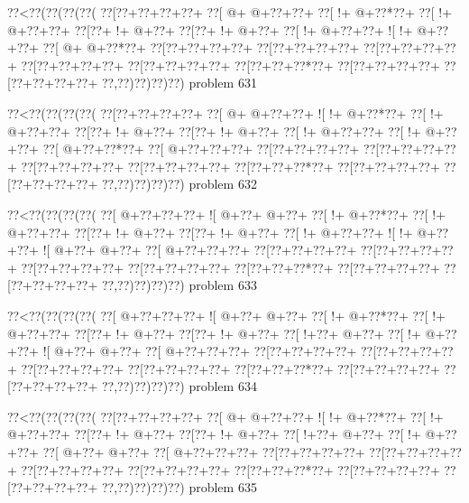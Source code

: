 \vbox{\vbox{\goo
\0??<\0??(\0??(\0??(\0??(
\0??[\0??+\0??+\0??+\0??+
\0??[\- @+\- @+\0??+\0??+
\0??[\- !+\- @+\0??*\0??+
\0??[\- !+\- @+\0??+\0??+
\0??[\0??+\- !+\- @+\0??+
\0??[\0??+\- !+\- @+\0??+
\0??[\- !+\- @+\0??+\0??+
\- ![\- !+\- @+\0??+\0??+
\0??[\- @+\- @+\0??*\0??+
\0??[\0??+\0??+\0??+\0??+
\0??[\0??+\0??+\0??+\0??+
\0??[\0??+\0??+\0??+\0??+
\0??[\0??+\0??+\0??+\0??+
\0??[\0??+\0??+\0??+\0??+
\0??[\0??+\0??+\0??*\0??+
\0??[\0??+\0??+\0??+\0??+
\0??[\0??+\0??+\0??+\0??+
\0??,\0??)\0??)\0??)\0??)
}
\hfil problem 631\hfil\break
}

\vbox{\vbox{\goo
\0??<\0??(\0??(\0??(\0??(
\0??[\0??+\0??+\0??+\0??+
\0??[\- @+\- @+\0??+\0??+
\- ![\- !+\- @+\0??*\0??+
\0??[\- !+\- @+\0??+\0??+
\0??[\0??+\- !+\- @+\0??+
\0??[\0??+\- !+\- @+\0??+
\0??[\- !+\- @+\0??+\0??+
\0??[\- !+\- @+\0??+\0??+
\0??[\- @+\0??+\0??*\0??+
\0??[\- @+\0??+\0??+\0??+
\0??[\0??+\0??+\0??+\0??+
\0??[\0??+\0??+\0??+\0??+
\0??[\0??+\0??+\0??+\0??+
\0??[\0??+\0??+\0??+\0??+
\0??[\0??+\0??+\0??*\0??+
\0??[\0??+\0??+\0??+\0??+
\0??[\0??+\0??+\0??+\0??+
\0??,\0??)\0??)\0??)\0??)
}
\hfil problem 632\hfil\break
}

\vbox{\vbox{\goo
\0??<\0??(\0??(\0??(\0??(
\0??[\- @+\0??+\0??+\0??+
\- ![\- @+\0??+\- @+\0??+
\0??[\- !+\- @+\0??*\0??+
\0??[\- !+\- @+\0??+\0??+
\0??[\0??+\- !+\- @+\0??+
\0??[\0??+\- !+\- @+\0??+
\0??[\- !+\- @+\0??+\0??+
\- ![\- !+\- @+\0??+\0??+
\- ![\- @+\0??+\- @+\0??+
\0??[\- @+\0??+\0??+\0??+
\0??[\0??+\0??+\0??+\0??+
\0??[\0??+\0??+\0??+\0??+
\0??[\0??+\0??+\0??+\0??+
\0??[\0??+\0??+\0??+\0??+
\0??[\0??+\0??+\0??*\0??+
\0??[\0??+\0??+\0??+\0??+
\0??[\0??+\0??+\0??+\0??+
\0??,\0??)\0??)\0??)\0??)
}
\hfil problem 633\hfil\break
}

\vbox{\vbox{\goo
\0??<\0??(\0??(\0??(\0??(
\0??[\- @+\0??+\0??+\0??+
\- ![\- @+\0??+\- @+\0??+
\0??[\- !+\- @+\0??*\0??+
\0??[\- !+\- @+\0??+\0??+
\0??[\0??+\- !+\- @+\0??+
\0??[\0??+\- !+\- @+\0??+
\0??[\- !+\0??+\- @+\0??+
\0??[\- !+\- @+\0??+\0??+
\- ![\- @+\0??+\- @+\0??+
\0??[\- @+\0??+\0??+\0??+
\0??[\0??+\0??+\0??+\0??+
\0??[\0??+\0??+\0??+\0??+
\0??[\0??+\0??+\0??+\0??+
\0??[\0??+\0??+\0??+\0??+
\0??[\0??+\0??+\0??*\0??+
\0??[\0??+\0??+\0??+\0??+
\0??[\0??+\0??+\0??+\0??+
\0??,\0??)\0??)\0??)\0??)
}
\hfil problem 634\hfil\break
}

\vbox{\vbox{\goo
\0??<\0??(\0??(\0??(\0??(
\0??[\0??+\0??+\0??+\0??+
\0??[\- @+\- @+\0??+\0??+
\- ![\- !+\- @+\0??*\0??+
\0??[\- !+\- @+\0??+\0??+
\0??[\0??+\- !+\- @+\0??+
\0??[\0??+\- !+\- @+\0??+
\0??[\- !+\0??+\- @+\0??+
\0??[\- !+\- @+\0??+\0??+
\0??[\- @+\0??+\- @+\0??+
\0??[\- @+\0??+\0??+\0??+
\0??[\0??+\0??+\0??+\0??+
\0??[\0??+\0??+\0??+\0??+
\0??[\0??+\0??+\0??+\0??+
\0??[\0??+\0??+\0??+\0??+
\0??[\0??+\0??+\0??*\0??+
\0??[\0??+\0??+\0??+\0??+
\0??[\0??+\0??+\0??+\0??+
\0??,\0??)\0??)\0??)\0??)
}
\hfil problem 635\hfil\break
}


